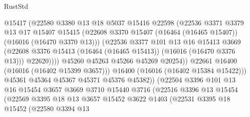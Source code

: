 \begin{lexlean}{RustStd}
\begin{coremodule}
                            @15417
                            (@22580
                              @3380
                              @13
                              @18
                              @5037
                              @15416
                              @22598
                              (@22536
                                @3371
                                @3379
                                @13
                                @17
                                @15407
                                @15415
                                (@22608
                                  @3370
                                  @15407
                                  (@16464 (@16465 @15407))
                                  (@16016 (@16470 @3370 @13)))
                                (@22536
                                  @3377
                                  @101
                                  @13
                                  @16
                                  @15413
                                  @3669
                                  (@22608
                                    @3376
                                    @15413
                                    (@16464 (@16465 @15413))
                                    (@16016 (@16470 @3376 @13)))
                                  @22620))))
                          @45260
                          @45263
                          @45266
                          @45269
                          @20254))
                      @22661
                      @16400
                      (@16016 (@16402 @15399 @3657)))
                    @16400
                    (@16016 (@16402 @15384 @15422)))
                  @45361
                  @45364
                  @45367
                  @45371
                  @45376
                  @45382))
              (@22504
                @3396
                @101
                @13
                @16
                @15454
                @3657
                @3669
                @3710
                @15440
                @3716
                (@22516
                  @3396
                  @13
                  @15454
                  (@22569
                    @3395
                    @18
                    @13
                    @3657
                    @15452
                    @3622
                    @1403
                    (@22531
                      @3395
                      @18
                      @15452
                      (@22580
                        @3394
                        @13

\end{coremodule}
\end{lexlean}
